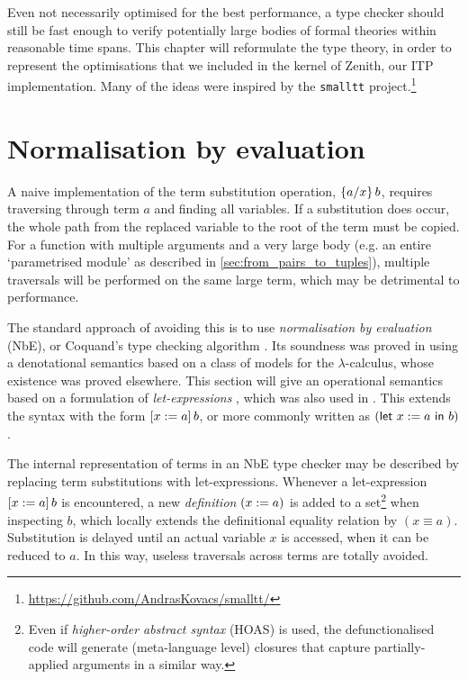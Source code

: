 \documentclass[twoside]{report}
\begin{document}
Even not necessarily optimised for the best performance, a type checker should still be fast enough to verify potentially large bodies of formal theories within reasonable time spans. This chapter will reformulate the type theory, in order to represent the optimisations that we included in the kernel of Zenith, our ITP implementation. Many of the ideas were inspired by the \texttt{smalltt} project.\footnote{\url{https://github.com/AndrasKovacs/smalltt/}}

\section{Normalisation by evaluation}
\label{sec:type_theory_def}

A naive implementation of the term substitution operation, $\subst x a b$, requires traversing through term $a$ and finding all variables. If a substitution does occur, the whole path from the replaced variable to the root of the term must be copied. For a function with multiple arguments and a very large body (e.g. an entire `parametrised module' as described in \cref{sec:from_pairs_to_tuples}), multiple traversals will be performed on the same large term, which may be detrimental to performance.

The standard approach of avoiding this is to use \emph{normalisation by evaluation} (NbE), or Coquand's type checking algorithm \cite{coquand1996algorithm}. Its soundness was proved in \cite{coquand1996algorithm} using a denotational semantics based on a class of models for the $\lambda$-calculus, whose existence was proved elsewhere. This section will give an operational semantics based on a formulation of \emph{let-expressions} \cite{severi1994pure}, which was also used in \cite{mcbride2000dependently}. This extends the syntax with the form $\llet x a b$, or more commonly written as $(\mathsf{let}\ x \defeq a\ \mathsf{in}\ b)$.

The internal representation of terms in an NbE type checker may be described by replacing term substitutions with let-expressions. Whenever a let-expression $\llet x a b$ is encountered, a new \emph{definition} $(x \defeq a)$ is added to a set\footnote{Even if \emph{higher-order abstract syntax} (HOAS) is used, the defunctionalised code will generate (meta-language level) closures that capture partially-applied arguments in a similar way.} when inspecting $b$, which locally extends the definitional equality relation by $(x \equiv a)$. Substitution is delayed until an actual variable $x$ is accessed, when it can be reduced to $a$. In this way, useless traversals across terms are totally avoided.
\end{document}
